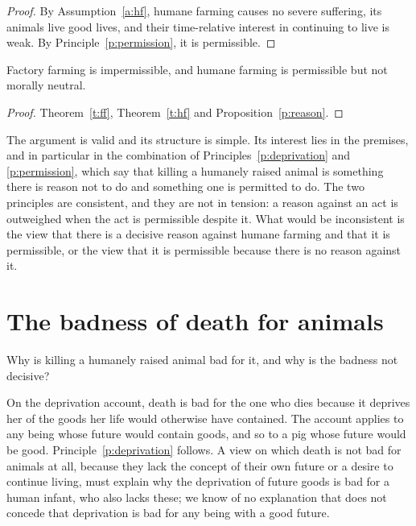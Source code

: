 \documentclass{situationist-preprint}
\begin{document}
\begin{proof}
By Assumption~\ref{a:hf}, humane farming causes no severe suffering, its animals live good lives, and their time-relative interest in continuing to live is weak. By Principle~\ref{p:permission}, it is permissible.
\end{proof}

\begin{corollary}\label{c:main}
Factory farming is impermissible, and humane farming is permissible but not morally neutral.
\end{corollary}

\begin{proof}
Theorem~\ref{t:ff}, Theorem~\ref{t:hf} and Proposition~\ref{p:reason}.
\end{proof}

The argument is valid and its structure is simple. Its interest lies in the premises, and in particular in the combination of Principles~\ref{p:deprivation} and \ref{p:permission}, which say that killing a humanely raised animal is something there is reason not to do and something one is permitted to do. The two principles are consistent, and they are not in tension: a reason against an act is outweighed when the act is permissible despite it. What would be inconsistent is the view that there is a decisive reason against humane farming and that it is permissible, or the view that it is permissible because there is no reason against it.

\section{The badness of death for animals}\label{s:death}

Why is killing a humanely raised animal bad for it, and why is the badness not decisive?

On the deprivation account, death is bad for the one who dies because it deprives her of the goods her life would otherwise have contained. The account applies to any being whose future would contain goods, and so to a pig whose future would be good. Principle~\ref{p:deprivation} follows. A view on which death is not bad for animals at all, because they lack the concept of their own future or a desire to continue living, must explain why the deprivation of future goods is bad for a human infant, who also lacks these; we know of no explanation that does not concede that deprivation is bad for any being with a good future.
\end{document}
